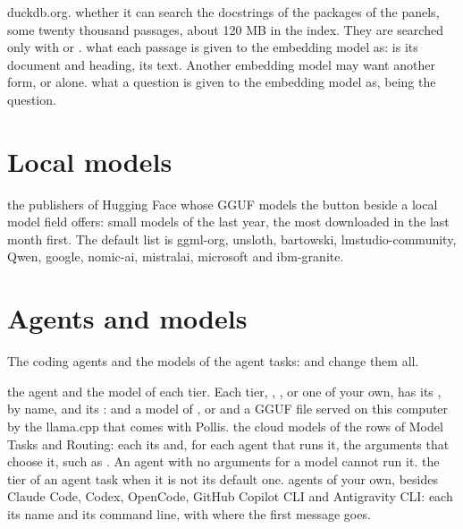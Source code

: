 \begin{itemize}
    duckdb.org.
    whether it can search the docstrings of the packages of the panels, some twenty thousand passages, about 120 MB in
    the index. They are searched only with  or .
    what each passage is given to the embedding model as:  is its document and heading,
     its text. Another embedding model may want another form, or  alone.
    what a question is given to the embedding model as,  being the question.
\end{itemize}

\section{Local models}\label{sec:local}
\begin{itemize}
    the publishers of Hugging Face whose GGUF models the  button beside a local model field offers:
    small models of the last year, the most downloaded in the last month first. The default list is ggml-org, unsloth,
    bartowski, lmstudio-community, Qwen, google, nomic-ai, mistralai, microsoft and ibm-granite.
\end{itemize}

\section{Agents and models}\label{sec:agents}
The coding agents and the models of the agent tasks:  and
 change them all.
\begin{itemize}
    the agent and the model of each tier. Each tier, , ,  or one of your own,
    has its , by name, and its :  and a model of ,
    or  and a GGUF file served on this computer by the llama.cpp that comes with Pollis.
    the cloud models of the rows of Model Tasks and Routing: each its  and, for each agent that runs it,
    the arguments that choose it, such as . An agent with no arguments for a model cannot
    run it.
    the tier of an agent task when it is not its default one.
    agents of your own, besides Claude Code, Codex, OpenCode, GitHub Copilot CLI and Antigravity CLI: each its name
    and its command line, with  where the first message goes.
\end{itemize}

